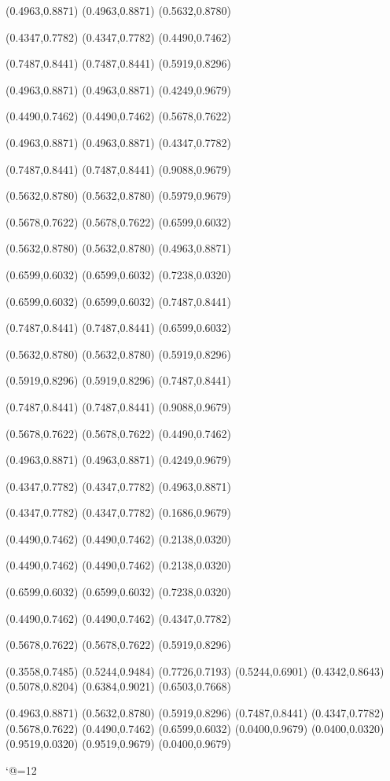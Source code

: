 \PST@Border(0.4963,0.8871)
(0.4963,0.8871)
(0.5632,0.8780)

\PST@Border(0.4347,0.7782)
(0.4347,0.7782)
(0.4490,0.7462)

\PST@Border(0.7487,0.8441)
(0.7487,0.8441)
(0.5919,0.8296)

\PST@Border(0.4963,0.8871)
(0.4963,0.8871)
(0.4249,0.9679)

\PST@Border(0.4490,0.7462)
(0.4490,0.7462)
(0.5678,0.7622)

\PST@Border(0.4963,0.8871)
(0.4963,0.8871)
(0.4347,0.7782)

\PST@Border(0.7487,0.8441)
(0.7487,0.8441)
(0.9088,0.9679)

\PST@Border(0.5632,0.8780)
(0.5632,0.8780)
(0.5979,0.9679)

\PST@Border(0.5678,0.7622)
(0.5678,0.7622)
(0.6599,0.6032)

\PST@Border(0.5632,0.8780)
(0.5632,0.8780)
(0.4963,0.8871)

\PST@Border(0.6599,0.6032)
(0.6599,0.6032)
(0.7238,0.0320)

\PST@Border(0.6599,0.6032)
(0.6599,0.6032)
(0.7487,0.8441)

\PST@Border(0.7487,0.8441)
(0.7487,0.8441)
(0.6599,0.6032)

\PST@Border(0.5632,0.8780)
(0.5632,0.8780)
(0.5919,0.8296)

\PST@Border(0.5919,0.8296)
(0.5919,0.8296)
(0.7487,0.8441)

\PST@Border(0.7487,0.8441)
(0.7487,0.8441)
(0.9088,0.9679)

\PST@Border(0.5678,0.7622)
(0.5678,0.7622)
(0.4490,0.7462)

\PST@Border(0.4963,0.8871)
(0.4963,0.8871)
(0.4249,0.9679)

\PST@Border(0.4347,0.7782)
(0.4347,0.7782)
(0.4963,0.8871)

\PST@Border(0.4347,0.7782)
(0.4347,0.7782)
(0.1686,0.9679)

\PST@Border(0.4490,0.7462)
(0.4490,0.7462)
(0.2138,0.0320)

\PST@Border(0.4490,0.7462)
(0.4490,0.7462)
(0.2138,0.0320)

\PST@Border(0.6599,0.6032)
(0.6599,0.6032)
(0.7238,0.0320)

\PST@Border(0.4490,0.7462)
(0.4490,0.7462)
(0.4347,0.7782)

\PST@Border(0.5678,0.7622)
(0.5678,0.7622)
(0.5919,0.8296)

\PST@Fillcircle(0.3558,0.7485)
\PST@Fillcircle(0.5244,0.9484)
\PST@Fillcircle(0.7726,0.7193)
\PST@Fillcircle(0.5244,0.6901)
\PST@Fillcircle(0.4342,0.8643)
\PST@Fillcircle(0.5078,0.8204)
\PST@Fillcircle(0.6384,0.9021)
\PST@Fillcircle(0.6503,0.7668)

\PST@Circle(0.4963,0.8871)
\PST@Circle(0.5632,0.8780)
\PST@Circle(0.5919,0.8296)
\PST@Circle(0.7487,0.8441)
\PST@Circle(0.4347,0.7782)
\PST@Circle(0.5678,0.7622)
\PST@Circle(0.4490,0.7462)
\PST@Circle(0.6599,0.6032)
\PST@Border(0.0400,0.9679)
(0.0400,0.0320)
(0.9519,0.0320)
(0.9519,0.9679)
(0.0400,0.9679)

\catcode`@=12
\fi
\endpspicture